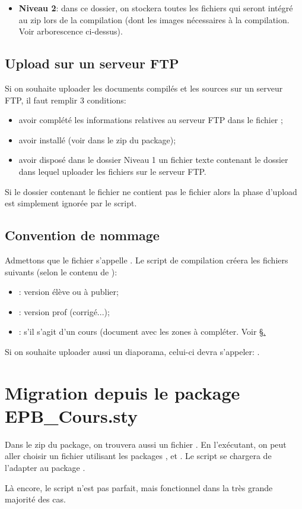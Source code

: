 \documentclass[11pt]{article}
\begin{document}
\vspace{-\UPSTIparskipValue}
\begin{itemize}
\item \textbf{Niveau 2}: dans ce dossier, on stockera toutes les fichiers qui seront intégré au zip lors de la compilation (dont les images nécessaires à la compilation. Voir arborescence ci-dessus).
\end{itemize}

\subsection{Upload sur un serveur FTP}
Si on souhaite uploader les documents compilés et les sources sur un serveur FTP, il faut remplir 3 conditions:
\begin{itemize}
\item avoir complété les informations relatives au serveur FTP dans le fichier ;
\item avoir installé  (voir dans le zip du package);
\item avoir disposé dans le dossier Niveau 1 un fichier texte  contenant le dossier dans lequel uploader les fichiers sur le serveur FTP.
\end{itemize}

Si le dossier contenant le fichier  ne contient pas le fichier  alors la phase d'upload est simplement ignorée par le script.

\subsection{Convention de nommage}
Admettons que le fichier  s'appelle . Le script de compilation créera les fichiers suivants (selon le contenu de ):
\begin{itemize}
\item {}: version élève ou à publier;
\item {}: version prof (corrigé...);
\item {}: s'il s'agit d'un cours (document avec les zones à compléter. Voir \S \href{aPublier}.
\end{itemize}

Si on souhaite uploader aussi un diaporama, celui-ci devra s'appeler: .

\section{Migration depuis le package EPB\_Cours.sty}
Dans le zip du package, on trouvera aussi un fichier . En l'exécutant, on peut aller choisir un fichier  utilisant les packages ,  et . Le script se chargera de l'adapter au package .

Là encore, le script n'est pas parfait, mais fonctionnel dans la très grande majorité des cas.
\end{document}
